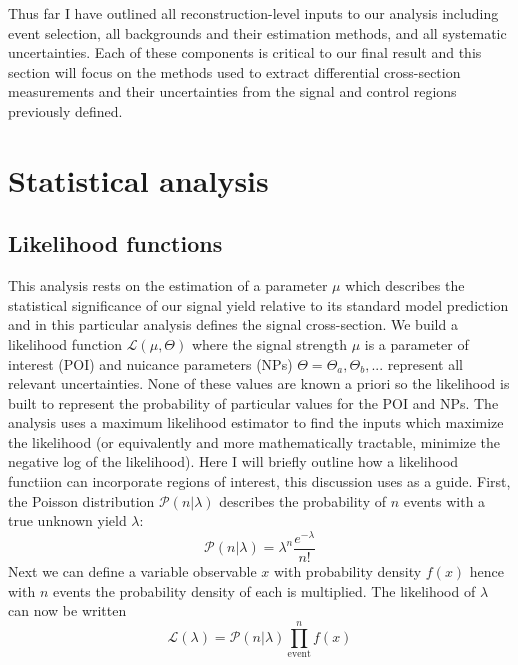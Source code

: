 Thus far I have outlined all reconstruction-level inputs to our analysis including event selection, all backgrounds and their estimation methods, and all systematic uncertainties. Each of these components is critical to our final result and this section will focus on the methods used to extract differential cross-section measurements and their uncertainties from the signal and control regions previously defined. 
\section{Statistical analysis}
\subsection{Likelihood functions}
This analysis rests on the estimation of a parameter $\mu$ which describes the statistical significance of our signal yield relative to its standard model prediction and in this particular analysis defines the signal cross-section. We build a likelihood function $\mathcal{L}(\mu,\Theta)$ where the signal strength $\mu$ is a parameter of interest (POI) and nuicance parameters (NPs) $\Theta=\Theta_a,\Theta_b,...$ represent all relevant uncertainties. None of these values are known a priori so the likelihood is built to represent the probability of particular values for the POI and NPs. The analysis uses a maximum likelihood estimator to find the inputs which maximize the likelihood (or equivalently and more mathematically tractable, minimize the negative log of the likelihood). Here I will briefly outline how a likelihood functiion can incorporate regions of interest, this discussion uses \cite{cranmer2015practical} as a guide. First, the Poisson distribution $\mathcal{P}(n|\lambda)$ describes the probability of $n$ events with a true unknown yield $\lambda$:
\begin{equation}
\mathcal{P}(n|\lambda)= \lambda^n\frac{e^{-\lambda}}{n!}
\end{equation}
Next we can define a variable observable $x$ with probability density $f(x)$ hence with $n$ events the probability density of each is multiplied. The likelihood of $\lambda$ can now be written
\begin{equation}
\mathcal{L}(\lambda)=\mathcal{P}(n|\lambda)\prod_{\text{event}}^n f(x)
\end{equation}
